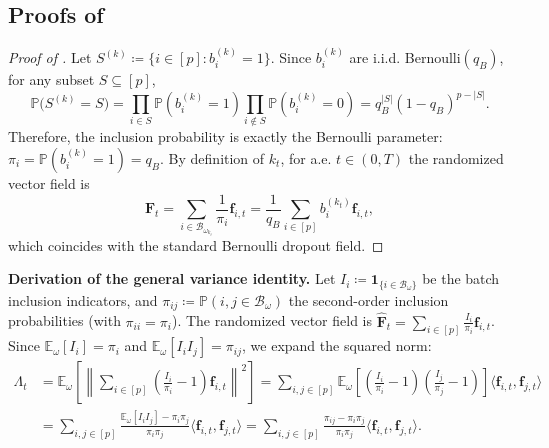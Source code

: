 \documentclass[twoside,11pt]{article}
\theoremstyle{plain}
\def\E{\mathbb E}
\newcommand{\bff}{\mathbf{f}}
\newcommand{\bfF}{\mathbf{F}}
\begin{document}
\subsection*{Proofs of }\label{ss:proofs41}

\begin{proof}[Proof of ]
Let $S^{(k)}\coloneqq\{i\in[p]: b_i^{(k)}=1\}$. Since $b_i^{(k)}$ are i.i.d. Bernoulli$(q_B)$, for any subset $S\subseteq[p]$,
\begin{equation*}
\mathbb{P}\big(S^{(k)}=S\big) = \prod_{i\in S}\mathbb{P}(b_i^{(k)}=1) \prod_{i\notin S}\mathbb{P}(b_i^{(k)}=0) = q_B^{|S|}(1-q_B)^{p-|S|}.
\end{equation*}
Therefore, the inclusion probability is exactly the Bernoulli parameter: $\pi_i = \mathbb{P}(b_i^{(k)}=1) = q_B$. By definition of $k_t$, for a.e. $t\in(0,T)$ the randomized vector field is
\begin{equation*}
\hat{\bfF}_t = \sum_{i\in\mathcal{B}_{\omega_{k_t}}}\frac{1}{\pi_i}\bff_{i,t} = \frac{1}{q_B}\sum_{i\in[p]} b_i^{(k_t)}\bff_{i,t},
\end{equation*}
which coincides with the standard Bernoulli dropout field.
\end{proof}

\noindent\textbf{Derivation of the general variance identity.}
Let $I_i \coloneqq \mathbf{1}_{\{i\in\mathcal{B}_\omega\}}$ be the batch inclusion indicators, and $\pi_{ij} \coloneqq \mathbb{P}(i,j\in\mathcal{B}_\omega)$ the second-order inclusion probabilities (with $\pi_{ii}=\pi_i$). The randomized vector field is $\hat{\bfF}_t = \sum_{i\in[p]} \frac{I_i}{\pi_i}\bff_{i,t}$. Since $\E_\omega[I_i] = \pi_i$ and $\E_\omega[I_i I_j] = \pi_{ij}$, we expand the squared norm:
\begin{align*}
\Lambda_t &= \E_\omega\left[\left\|\sum_{i\in[p]} \left(\frac{I_i}{\pi_i}-1\right)\bff_{i,t}\right\|^2\right] = \sum_{i,j\in[p]} \E_\omega\left[\left(\frac{I_i}{\pi_i}-1\right)\left(\frac{I_j}{\pi_j}-1\right)\right] \langle\bff_{i,t},\bff_{j,t}\rangle \\
&= \sum_{i,j\in[p]} \frac{\E_\omega[I_i I_j] - \pi_i\pi_j}{\pi_i\pi_j} \langle\bff_{i,t},\bff_{j,t}\rangle = \sum_{i,j\in[p]} \frac{\pi_{ij}-\pi_i\pi_j}{\pi_i\pi_j} \langle\bff_{i,t},\bff_{j,t}\rangle.
\end{align*}
\end{document}
